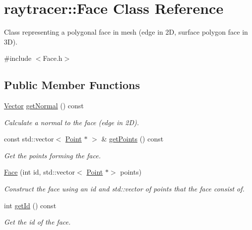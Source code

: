 \hypertarget{classraytracer_1_1Face}{}\section{raytracer\+:\+:Face Class Reference}
\label{classraytracer_1_1Face}


Class representing a polygonal face in mesh (edge in 2D, surface polygon face in 3D).  




{\ttfamily \#include $<$Face.\+h$>$}

\subsection*{Public Member Functions}
\begin{DoxyCompactItemize}
\item 
\hyperlink{classraytracer_1_1Vector}{Vector} \hyperlink{classraytracer_1_1Face_a4b7079a236be6c724a160250eccf3bac}{get\+Normal} () const
\begin{DoxyCompactList}\small\item\em Calculate a normal to the face (edge in 2D). \end{DoxyCompactList}\item 
const std\+::vector$<$ \hyperlink{classraytracer_1_1Point}{Point} $\ast$ $>$ \& \hyperlink{classraytracer_1_1Face_a54b2f1c95ee3d187ca286e7519450af0}{get\+Points} () const
\begin{DoxyCompactList}\small\item\em Get the points forming the face. \end{DoxyCompactList}\item 
\hyperlink{classraytracer_1_1Face_ad1d772053e4782fe0291df924d3beffe}{Face} (int id, std\+::vector$<$ \hyperlink{classraytracer_1_1Point}{Point} $\ast$$>$ points)
\begin{DoxyCompactList}\small\item\em Construct the face using an id and std\+::vector of points that the face consist of. \end{DoxyCompactList}\item 
int \hyperlink{classraytracer_1_1Face_a1693a7b1269bea1cb1e9ce72f1d10c04}{get\+Id} () const
\begin{DoxyCompactList}\small\item\em Get the id of the face. \end{DoxyCompactList}\end{DoxyCompactItemize}


